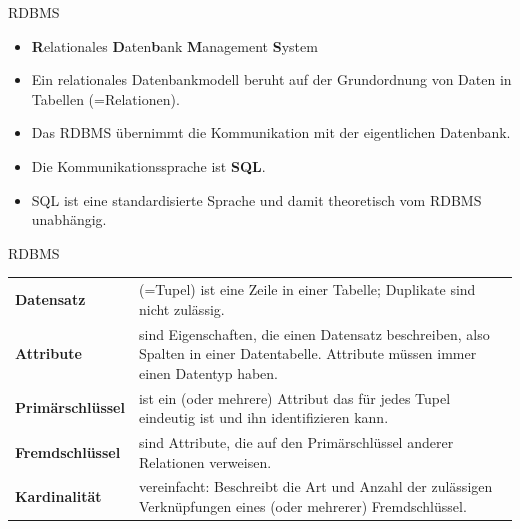 \documentclass[18pt]{beamer}
\begin{document}
\begin{frame}{RDBMS}
\begin{itemize}
\item \textbf{R}elationales \textbf{D}aten\textbf{b}ank \textbf{M}anagement \textbf{S}ystem
\item Ein relationales Datenbankmodell beruht auf der Grundordnung von Daten in Tabellen (=Relationen).
\item Das RDBMS übernimmt die Kommunikation mit der eigentlichen Datenbank. 
\item Die Kommunikationssprache ist \textbf{SQL}.
\item SQL ist eine standardisierte Sprache und damit theoretisch vom RDBMS unabhängig.
\end{itemize}
\end{frame}

\begin{frame}{RDBMS}
\begin{table}
\begin{tabular}{p{}p{}}
\textbf{Datensatz} & (=Tupel) ist eine Zeile in einer Tabelle; Duplikate sind nicht zulässig.\\
\textbf{Attribute} & sind Eigenschaften, die einen Datensatz beschreiben, also Spalten in einer Datentabelle. Attribute müssen immer einen Datentyp haben.\\
\textbf{Primärschlüssel} & ist ein (oder mehrere) Attribut das für jedes Tupel eindeutig ist und ihn identifizieren kann. \\
\textbf{Fremdschlüssel} & sind Attribute, die auf den Primärschlüssel anderer Relationen verweisen. \\
\textbf{Kardinalität} & vereinfacht: Beschreibt die Art und Anzahl der zulässigen Verknüpfungen eines (oder mehrerer) Fremdschlüssel.\\
\end{tabular}
\end{table}
\end{frame}
\end{document}
